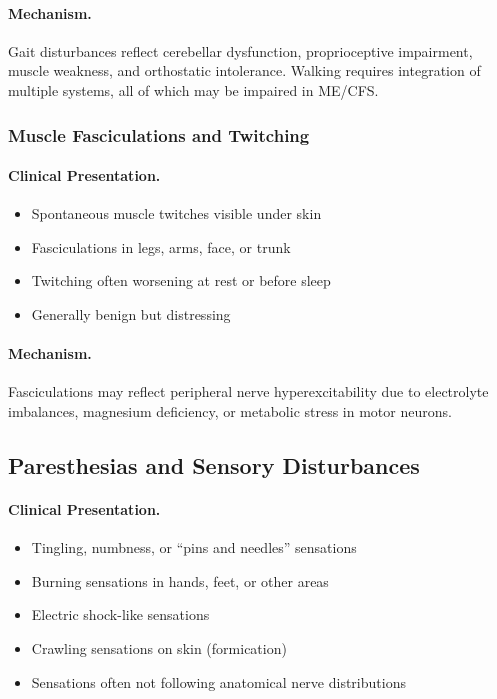 \paragraph{Mechanism.}
Gait disturbances reflect cerebellar dysfunction, proprioceptive impairment, muscle weakness, and orthostatic intolerance. Walking requires integration of multiple systems, all of which may be impaired in ME/CFS.

\subsubsection{Muscle Fasciculations and Twitching}

\paragraph{Clinical Presentation.}
\begin{itemize}
    \item Spontaneous muscle twitches visible under skin
    \item Fasciculations in legs, arms, face, or trunk
    \item Twitching often worsening at rest or before sleep
    \item Generally benign but distressing
\end{itemize}

\paragraph{Mechanism.}
Fasciculations may reflect peripheral nerve hyperexcitability due to electrolyte imbalances, magnesium deficiency, or metabolic stress in motor neurons.

\subsection{Paresthesias and Sensory Disturbances}
\label{subsec:paresthesias}

\paragraph{Clinical Presentation.}
\begin{itemize}
    \item Tingling, numbness, or ``pins and needles'' sensations
    \item Burning sensations in hands, feet, or other areas
    \item Electric shock-like sensations
    \item Crawling sensations on skin (formication)
    \item Sensations often not following anatomical nerve distributions
\end{itemize}

